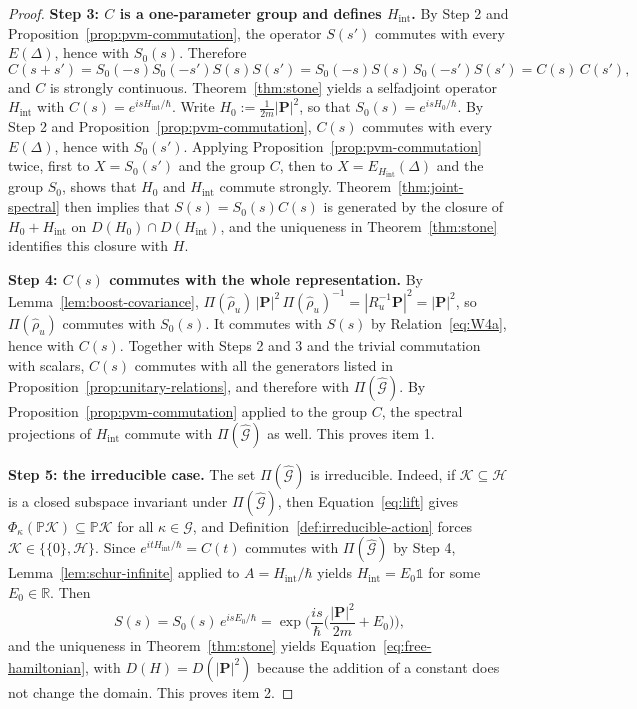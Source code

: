 \begin{proof}
	\medskip
	\noindent\textbf{Step 3: $C$ is a one-parameter group and defines $H_{\mathrm{int}}$.} By Step 2 and Proposition~\ref{prop:pvm-commutation}, the operator $S(s')$ commutes with every $E(\Delta)$, hence with $S_0(s)$. Therefore
	\begin{equation*}
		C(s+s')=S_0(-s)S_0(-s')S(s)S(s')=S_0(-s)S(s)\,S_0(-s')S(s')=C(s)\,C(s'),
	\end{equation*}
	and $C$ is strongly continuous. Theorem~\ref{thm:stone} yields a selfadjoint operator $H_{\mathrm{int}}$ with $C(s)=e^{isH_{\mathrm{int}}/\hbar}$. Write $H_0:=\frac{1}{2m}|\mathbf{P}|^2$, so that $S_0(s)=e^{isH_0/\hbar}$. By Step 2 and Proposition~\ref{prop:pvm-commutation}, $C(s)$ commutes with every $E(\Delta)$, hence with $S_0(s')$. Applying Proposition~\ref{prop:pvm-commutation} twice, first to $X=S_0(s')$ and the group $C$, then to $X=E_{H_{\mathrm{int}}}(\Delta)$ and the group $S_0$, shows that $H_0$ and $H_{\mathrm{int}}$ commute strongly. Theorem~\ref{thm:joint-spectral} then implies that $S(s)=S_0(s)C(s)$ is generated by the closure of $H_0+H_{\mathrm{int}}$ on $D(H_0)\cap D(H_{\mathrm{int}})$, and the uniqueness in Theorem~\ref{thm:stone} identifies this closure with $H$.
	
	\medskip
	\noindent\textbf{Step 4: $C(s)$ commutes with the whole representation.} By Lemma~\ref{lem:boost-covariance}, $\Pi(\hat\rho_u)\,|\mathbf{P}|^2\,\Pi(\hat\rho_u)^{-1}=|R_u^{-1}\mathbf{P}|^2=|\mathbf{P}|^2$, so $\Pi(\hat\rho_u)$ commutes with $S_0(s)$. It commutes with $S(s)$ by Relation~\eqref{eq:W4a}, hence with $C(s)$. Together with Steps 2 and 3 and the trivial commutation with scalars, $C(s)$ commutes with all the generators listed in Proposition~\ref{prop:unitary-relations}, and therefore with $\Pi(\widehat{\mathcal{G}})$. By Proposition~\ref{prop:pvm-commutation} applied to the group $C$, the spectral projections of $H_{\mathrm{int}}$ commute with $\Pi(\widehat{\mathcal{G}})$ as well. This proves item 1.
	
	\medskip
	\noindent\textbf{Step 5: the irreducible case.} The set $\Pi(\widehat{\mathcal{G}})$ is irreducible. Indeed, if $\mathcal{K}\subseteq\mathcal{H}$ is a closed subspace invariant under $\Pi(\widehat{\mathcal{G}})$, then Equation~\eqref{eq:lift} gives $\Phi_\kappa(\mathbb{P}\mathcal{K})\subseteq\mathbb{P}\mathcal{K}$ for all $\kappa\in\mathcal{G}$, and Definition~\ref{def:irreducible-action} forces $\mathcal{K}\in\{\{0\},\mathcal{H}\}$. Since $e^{itH_{\mathrm{int}}/\hbar}=C(t)$ commutes with $\Pi(\widehat{\mathcal{G}})$ by Step 4, Lemma~\ref{lem:schur-infinite} applied to $A=H_{\mathrm{int}}/\hbar$ yields $H_{\mathrm{int}}=E_0\mathbb{1}$ for some $E_0\in\mathbb{R}$. Then
	\begin{equation*}
		S(s)=S_0(s)\,e^{isE_0/\hbar}=\exp\!\Big(\frac{is}{\hbar}\Big(\frac{|\mathbf{P}|^2}{2m}+E_0\Big)\Big),
	\end{equation*}
	and the uniqueness in Theorem~\ref{thm:stone} yields Equation~\eqref{eq:free-hamiltonian}, with $D(H)=D(|\mathbf{P}|^2)$ because the addition of a constant does not change the domain. This proves item 2.
	

\end{proof}
